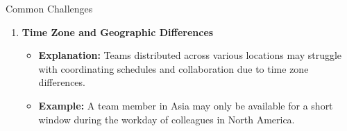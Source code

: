 \documentclass[aspectratio=169]{beamer}
\begin{document}
\begin{frame}[fragile]
\begin{block}{Common Challenges}
\begin{enumerate}
            \item \textbf{Time Zone and Geographic Differences}
                \begin{itemize}
                    \item \textbf{Explanation:} Teams distributed across various locations may struggle with coordinating schedules and collaboration due to time zone differences.
                    \item \textbf{Example:} A team member in Asia may only be available for a short window during the workday of colleagues in North America.
                \end{itemize}
        \end{enumerate}
    \end{block}
\end{frame}
\end{document}
